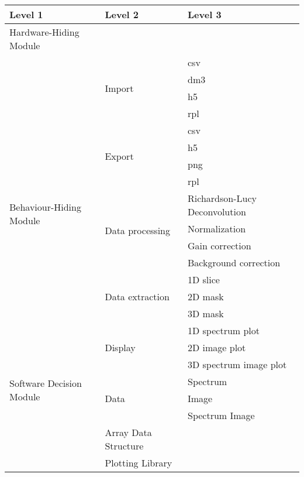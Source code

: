 \begin{tabular}{p{} p{} p{}}
\toprule
\textbf{Level 1} & \textbf{Level 2} & \textbf{Level 3}\\
\midrule

{Hardware-Hiding Module} & ~ & ~ \\
\midrule

\multirow{18}{0.25\textwidth}{Behaviour-Hiding Module} &
\multirow{4}{0.25\textwidth}{Import} & csv\\
& & dm3\\
& & h5\\
& & rpl\\\cline{2-3}
& \multirow{4}{0.25\textwidth}{Export} & csv\\
& & h5\\
& & png\\
& & rpl\\\cline{2-3}
& \multirow{4}{0.25\textwidth}{Data processing} & Richardson-Lucy
Deconvolution\\
& & Normalization\\
& & Gain correction\\
& & Background correction\\\cline{2-3}
& \multirow{3}{0.25\textwidth}{Data extraction} & 1D slice\\
& & 2D mask\\
& & 3D mask\\\cline{2-3}
& \multirow{3}{0.25\textwidth}{Display} & 1D spectrum plot\\
& & 2D image plot\\
& & 3D spectrum image plot\\
\midrule

\multirow{2}{0.25\textwidth}{Software Decision Module} &
\multirow{3}{0.25\textwidth}{Data} & Spectrum\\
& & Image\\
& & Spectrum Image\\\cline{2-3}
& Array Data Structure\\\cline{2-3}
& Plotting Library\\

\bottomrule

\end{tabular}